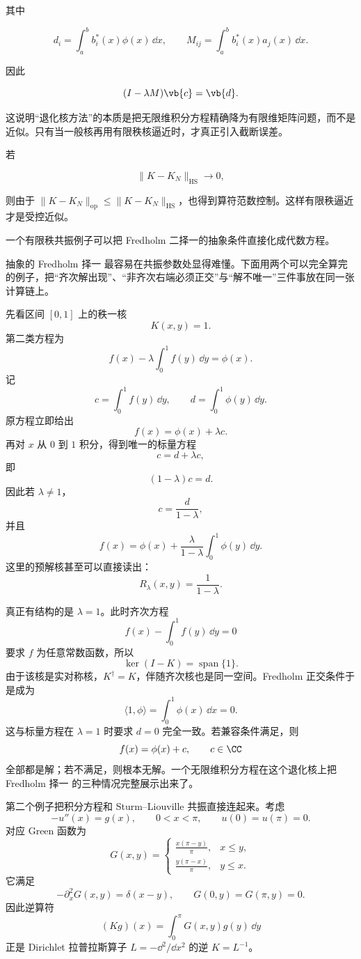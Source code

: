 其中

\[
d_i=\int_a^b b_i^*(x)\phi(x)\,\dd x,
\qquad
M_{ij}=\int_a^b b_i^*(x)a_j(x)\,\dd x.
\]

因此

\[
(I-\lambda M)\vb{c}=\vb{d}.
\]

这说明``退化核方法''的本质是把无限维积分方程精确降为有限维矩阵问题，而不是近似。只有当一般核再用有限秩核逼近时，才真正引入截断误差。

若

\[
\|K-K_N\|_{\mathrm{HS}}\to0,
\]

则由于 $\|K-K_N\|_{\mathrm{op}}\le\|K-K_N\|_{\mathrm{HS}}$，也得到算符范数控制。这样有限秩逼近才是受控近似。

一个有限秩共振例子可以把 Fredholm 二择一的抽象条件直接化成代数方程。

抽象的 Fredholm 择一 最容易在共振参数处显得难懂。下面用两个可以完全算完的例子，把``齐次解出现''、``非齐次右端必须正交''与``解不唯一''三件事放在同一张计算链上。

先看区间 $[0,1]$ 上的秩一核
\[
K(x,y)=1.
\]
第二类方程为
\begin{equation*}f(x)-\lambda\int_0^1 f(y)\,\dd y=\phi(x).\end{equation*}
记
\[
c=\int_0^1f(y)\,\dd y,
\qquad
d=\int_0^1\phi(y)\,\dd y.
\]
原方程立即给出
\[
f(x)=\phi(x)+\lambda c.
\]
再对 $x$ 从 $0$ 到 $1$ 积分，得到唯一的标量方程
\[
c=d+\lambda c,
\]
即
\[
(1-\lambda)c=d.
\]
因此若 $\lambda\neq1$，
\[
c=\frac{d}{1-\lambda},
\]
并且
\begin{equation*}{
f(x)=\phi(x)+\frac{\lambda}{1-\lambda}
\int_0^1\phi(y)\,\dd y
}.\end{equation*}
这里的预解核甚至可以直接读出：
\[
R_\lambda(x,y)=\frac1{1-\lambda}.
\]

真正有结构的是 $\lambda=1$。此时齐次方程
\[
f(x)-\int_0^1f(y)\,\dd y=0
\]
要求 $f$ 为任意常数函数，所以
\[
\ker(I-K)=\operatorname{span}\{1\}.
\]
由于该核是实对称核，$K^\dagger=K$，伴随齐次核也是同一空间。Fredholm 正交条件于是成为
\[
\langle1,\phi\rangle
=\int_0^1\phi(x)\,\dd x=0.
\]
这与标量方程在 $\lambda=1$ 时要求 $d=0$ 完全一致。若兼容条件满足，则
\[
f(x)=\phi(x)+c,
\qquad c\in\CC
\]
全部都是解；若不满足，则根本无解。一个无限维积分方程在这个退化核上把 Fredholm 择一 的三种情况完整展示出来了。

第二个例子把积分方程和 Sturm--Liouville 共振直接连起来。考虑
\[
-u''(x)=g(x),
\qquad 0<x<\pi,
\qquad u(0)=u(\pi)=0.
\]
对应 Green 函数为
\[
G(x,y)=
\begin{cases}
\displaystyle \frac{x(\pi-y)}{\pi},&x\le y,\\[1ex]
\displaystyle \frac{y(\pi-x)}{\pi},&y\le x.
\end{cases}
\]
它满足
\[
-\partial_x^2G(x,y)=\delta(x-y),
\qquad G(0,y)=G(\pi,y)=0.
\]
因此逆算符
\[
(Kg)(x)=\int_0^\pi G(x,y)g(y)\,\dd y
\]
正是 Dirichlet 拉普拉斯算子 $L=-\dd^2/\dd x^2$ 的逆 $K=L^{-1}$。

